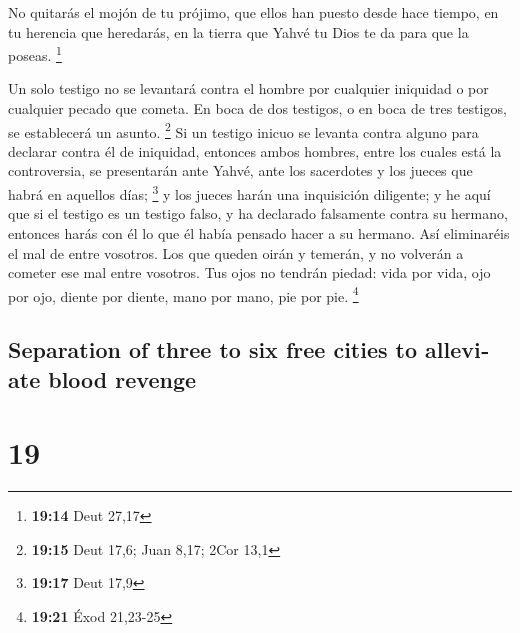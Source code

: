 \begin{paracol}{2}
 No quitarás el mojón de tu prójimo, que ellos han puesto
desde hace tiempo, en tu herencia que heredarás, en la tierra que Yahvé
tu Dios te da para que la poseas. \footnote{\textbf{19:14} Deut 27,17}

 Un solo testigo no se levantará contra el hombre por
cualquier iniquidad o por cualquier pecado que cometa. En boca de dos
testigos, o en boca de tres testigos, se establecerá un asunto.
\footnote{\textbf{19:15} Deut 17,6; Juan 8,17; 2Cor 13,1}
 Si un testigo inicuo se levanta contra alguno para
declarar contra él de iniquidad,  entonces ambos hombres,
entre los cuales está la controversia, se presentarán ante Yahvé, ante
los sacerdotes y los jueces que habrá en aquellos días; \footnote{\textbf{19:17}
  Deut 17,9}  y los jueces harán una inquisición
diligente; y he aquí que si el testigo es un testigo falso, y ha
declarado falsamente contra su hermano,  entonces harás
con él lo que él había pensado hacer a su hermano. Así eliminaréis el
mal de entre vosotros.  Los que queden oirán y temerán, y
no volverán a cometer ese mal entre vosotros.  Tus ojos
no tendrán piedad: vida por vida, ojo por ojo, diente por diente, mano
por mano, pie por pie. \footnote{\textbf{19:21} Éxod 21,23-25}

\switchcolumn
\begin{otherlanguage}{english}

\hypertarget{separation-of-three-to-six-free-cities-to-alleviate-blood-revenge}{%
\subsection{Separation of three to six free cities to alleviate blood
revenge}\label{separation-of-three-to-six-free-cities-to-alleviate-blood-revenge}}

\hypertarget{section-37}{%
\section{19}\label{section-37}}


\end{otherlanguage}
\end{paracol}

